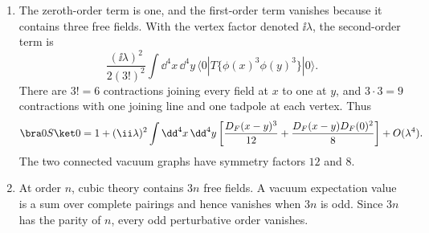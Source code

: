 \begin{enumerate}
\begin{enumerate}
\item
The zeroth-order term is one, and the first-order term vanishes because
it contains three free fields.  With the vertex factor denoted \(\ii\lambda\),
the second-order term is
\[
 \frac{(\ii\lambda)^2}{2(3!)^2}
 \int \dd^4x\,\dd^4y\,
 \langle0|T\{\phi(x)^3\phi(y)^3\}|0\rangle.
\]
There are \(3!=6\) contractions joining every field at \(x\) to one at
\(y\), and \(3\cdot3=9\) contractions with one joining line and one
tadpole at each vertex.  Thus
\[
 \bra0S\ket0
 =1+(\ii\lambda)^2\int \dd^4x\,\dd^4y
 \left[\frac{D_F(x-y)^3}{12}
 +\frac{D_F(x-y)D_F(0)^2}{8}\right]+O(\lambda^4).
\]
The two connected vacuum graphs have symmetry factors \(12\) and \(8\).
\item
At order \(n\), cubic theory contains \(3n\) free fields.  A vacuum
expectation value is a sum over complete pairings and hence vanishes when
\(3n\) is odd.  Since \(3n\) has the parity of \(n\), every odd
perturbative order vanishes.


\end{enumerate}
\end{enumerate}
